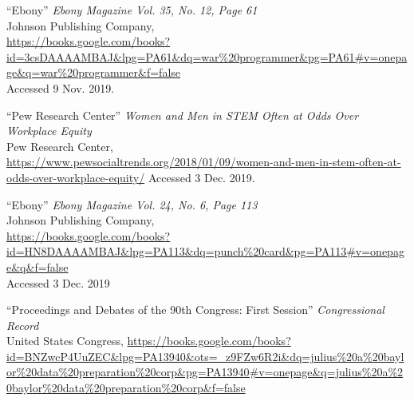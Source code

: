 \documentclass[a4paper,12pt]{article}
\begin{document}
\begin{thebibliography}{9}

``Ebony'' \textit{Ebony Magazine Vol. 35, No. 12, Page 61}\\
Johnson Publishing Company, \\
\url{https://books.google.com/books?id=3csDAAAAMBAJ&lpg=PA61&dq=war%20programmer&pg=PA61#v=onepage&q=war%20programmer&f=false}  \\
Accessed 9 Nov. 2019.

``Pew Research Center'' \textit{Women and Men in STEM Often at Odds Over Workplace Equity} \\
Pew Research Center,\\
\url{https://www.pewsocialtrends.org/2018/01/09/women-and-men-in-stem-often-at-odds-over-workplace-equity/}
Accessed 3 Dec. 2019.

``Ebony''
\textit{Ebony Magazine Vol. 24, No. 6, Page 113} \\
Johnson Publishing Company, \\
\url{https://books.google.com/books?id=HN8DAAAAMBAJ&lpg=PA113&dq=punch%20card&pg=PA113#v=onepage&q&f=false} \\
Accessed 3 Dec. 2019

``Proceedings and Debates of the 90th Congress: First Session''
\textit{Congressional Record} \\
United States Congress,
\url{https://books.google.com/books?id=BNZwcP4UuZEC&lpg=PA13940&ots=_z9FZw6R2i&dq=julius%20a%20baylor%20data%20preparation%20corp&pg=PA13940#v=onepage&q=julius%20a%20baylor%20data%20preparation%20corp&f=false} %

\end{thebibliography}

\newpage

\end{document}

